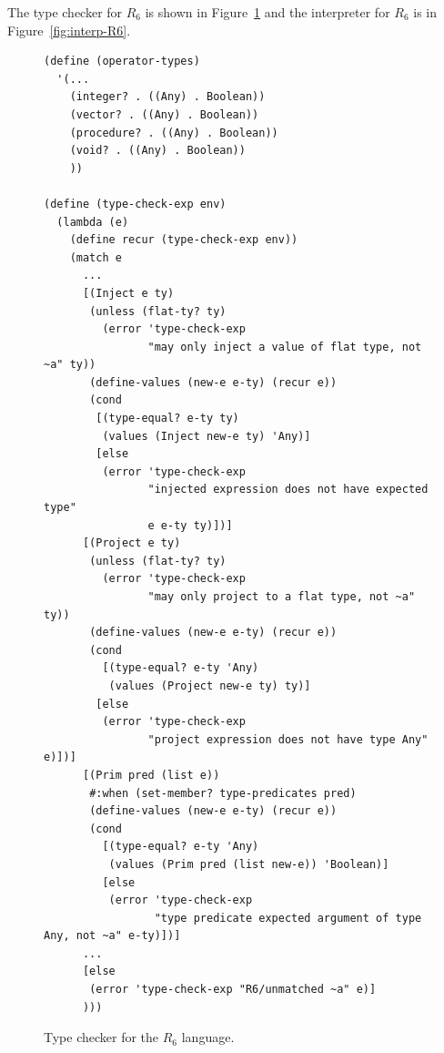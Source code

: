 \documentclass[11pt]{book}
\begin{document}
The type checker for $R_6$ is shown in Figure~\ref{fig:type-check-R6}
and the interpreter for $R_6$ is in Figure~\ref{fig:interp-R6}.

\begin{figure}[btp]
 \begin{lstlisting}[basicstyle=\ttfamily\footnotesize]
(define (operator-types)
  '(...
    (integer? . ((Any) . Boolean))
    (vector? . ((Any) . Boolean))
    (procedure? . ((Any) . Boolean))
    (void? . ((Any) . Boolean))
    ))
    
(define (type-check-exp env)
  (lambda (e)
    (define recur (type-check-exp env))
    (match e
      ...  
      [(Inject e ty)
       (unless (flat-ty? ty)
         (error 'type-check-exp
                "may only inject a value of flat type, not ~a" ty))
       (define-values (new-e e-ty) (recur e))
       (cond
        [(type-equal? e-ty ty)
         (values (Inject new-e ty) 'Any)]
        [else
         (error 'type-check-exp
                "injected expression does not have expected type" 
                e e-ty ty)])]
      [(Project e ty)
       (unless (flat-ty? ty)
         (error 'type-check-exp
                "may only project to a flat type, not ~a" ty))
       (define-values (new-e e-ty) (recur e))
       (cond
         [(type-equal? e-ty 'Any)
          (values (Project new-e ty) ty)]
        [else
         (error 'type-check-exp
                "project expression does not have type Any" e)])]
      [(Prim pred (list e))
       #:when (set-member? type-predicates pred)
       (define-values (new-e e-ty) (recur e))
       (cond
         [(type-equal? e-ty 'Any)
          (values (Prim pred (list new-e)) 'Boolean)]
         [else
          (error 'type-check-exp
                 "type predicate expected argument of type Any, not ~a" e-ty)])]
      ...
      [else 
       (error 'type-check-exp "R6/unmatched ~a" e)]
      )))
\end{lstlisting}
\caption{Type checker for the $R_6$ language.}
\label{fig:type-check-R6}
\end{figure}

\end{document}
